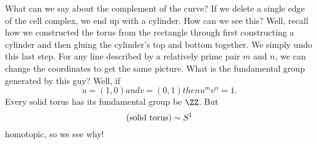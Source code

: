 What can we say about the complement of the curve? If we delete a
single edge of the cell complex, we end up with a cylinder. How
can we see this? Well, recall how we constructed the torus from
the rectangle through first constructing a cylinder and then
gluing the cylinder's top and bottom together. We simply undo
this last step. For any line described by a relatively prime pair
$m$ and $n$, we can change the coordinates to get the same
picture. What is the fundamental group generated by this guy?
Well, if
\begin{subequations}
\begin{equation}
u=(1,0)
\end{equation}
and
\begin{equation}
v=(0,1)
\end{equation}
then
\begin{equation}
u^{m}v^{n}=1.
\end{equation}
\end{subequations}
Every solid torus has its fundamental group be
$\ZZ$.
But
\begin{equation}
(\mbox{solid torus})\sim S^1
\end{equation}
homotopic, so we see why!

